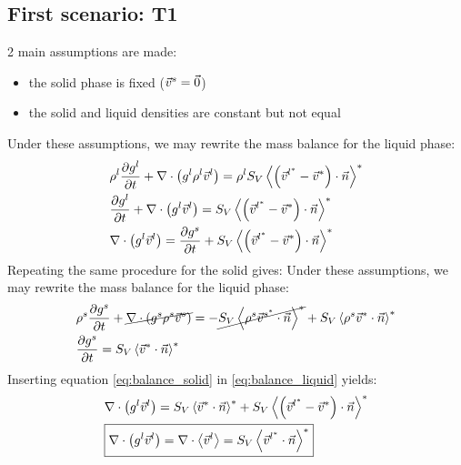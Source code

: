 \documentclass[11pt,a4paper]{article}
\begin{document}
\subsection{First scenario: T1}
2 main assumptions are made:
\begin{itemize}
\item the solid phase is fixed ($\vec{v}^s=\vec{0}$)
\item the solid and liquid densities are constant but not equal
\end{itemize}
Under these assumptions, we may rewrite the mass balance for the liquid phase:
\begin{subequations}
\begin{align}
& \rho^l\frac{\partial g^l}{\partial t}  + \nabla \cdot \left( g^l \rho^l \vec{v}^l \right) = \rho^l  S_V \left\langle  \left( \vec{v}^{l^*}-\vec{v}^{*} \right) \cdot \vec{n} \right\rangle^*  \\
&  \frac{\partial g^l}{\partial t}  + \nabla \cdot \left( g^l \vec{v}^l \right) =  S_V \left\langle  \left( \vec{v}^{l^*}-\vec{v}^{*} \right) \cdot \vec{n} \right\rangle^*  \\
\label{eq:balance_liquid}
&  \nabla \cdot \left( g^l \vec{v}^l \right) = \frac{\partial g^s}{\partial t}  + S_V \left\langle  \left( \vec{v}^{l^*}-\vec{v}^{*} \right) \cdot \vec{n} \right\rangle^*
\end{align}
\end{subequations}
Repeating the same procedure for the solid gives:
Under these assumptions, we may rewrite the mass balance for the liquid phase:
\begin{subequations}
\begin{align}
& \rho^s\frac{\partial g^s }{\partial t}  + \cancel{\nabla \cdot \left( g^s \rho^s \vec{v}^s \right) } = - \cancel{S_V \left\langle  \rho^s \vec{v}^{s^*} \cdot \vec{n} \right\rangle^*} + S_V \left\langle \rho^s \vec{v}^* \cdot \vec{n} \right\rangle^*  \\
\label{eq:balance_solid}
&  \frac{\partial g^s}{\partial t}   = S_V \left\langle  \vec{v}^* \cdot \vec{n} \right\rangle^*
\end{align}
\end{subequations}
Inserting equation \eqref{eq:balance_solid} in \eqref{eq:balance_liquid} yields:
\begin{subequations}
\begin{align}
&  \nabla \cdot \brac{\gl \vl} = S_V \avg{ \vec{v}^* \cdot \vec{n}}^* + S_V \avg{ \brac{\vec{v}^{l^*}-\vec{v}^{*}} \cdot \vec{n}}^* \\
\label{eq:mass_balance_phases}
& \boxed{ \nabla \cdot \brac{\gl \vl} 
		= \nabla \cdot \avg{\vec{v}^l}  
		= S_V \avg{ \vec{v}^{l^*} \cdot \vec{n}}^*} \\
%
\end{align}
\end{subequations}
\end{document}
